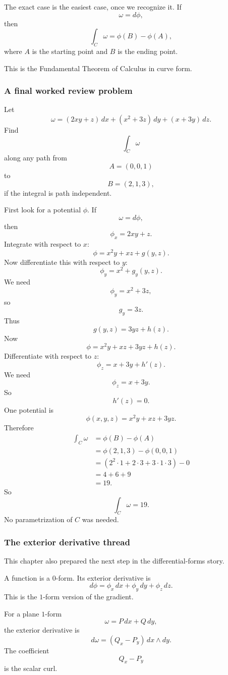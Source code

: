 The exact case is the easiest case, once we recognize it.  If
\[
    \omega=d\phi,
\]
then
\[
\boxed{
    \int_C \omega=\phi(B)-\phi(A),
}
\]
where \(A\) is the starting point and \(B\) is the ending point.

This is the Fundamental Theorem of Calculus in curve form.

\subsubsection*{A final worked review problem}

Let
\[
    \omega=(2xy+z)\,dx+(x^2+3z)\,dy+(x+3y)\,dz.
\]
Find
\[
    \int_C \omega
\]
along any path from
\[
    A=(0,0,1)
\]
to
\[
    B=(2,1,3),
\]
if the integral is path independent.

First look for a potential \(\phi\).  If
\[
    \omega=d\phi,
\]
then
\[
    \phi_x=2xy+z.
\]
Integrate with respect to \(x\):
\[
    \phi=x^2y+xz+g(y,z).
\]
Now differentiate this with respect to \(y\):
\[
    \phi_y=x^2+g_y(y,z).
\]
We need
\[
    \phi_y=x^2+3z,
\]
so
\[
    g_y=3z.
\]
Thus
\[
    g(y,z)=3yz+h(z).
\]
Now
\[
    \phi=x^2y+xz+3yz+h(z).
\]
Differentiate with respect to \(z\):
\[
    \phi_z=x+3y+h'(z).
\]
We need
\[
    \phi_z=x+3y.
\]
So
\[
    h'(z)=0.
\]
One potential is
\[
\boxed{
    \phi(x,y,z)=x^2y+xz+3yz.
}
\]
Therefore
\[
\begin{aligned}
\int_C \omega
&=
\phi(B)-\phi(A)\\
&=
\phi(2,1,3)-\phi(0,0,1)\\
&=
(2^2\cdot1+2\cdot3+3\cdot1\cdot3)-0\\
&=
4+6+9\\
&=
19.
\end{aligned}
\]
So
\[
\boxed{
    \int_C \omega=19.
}
\]
No parametrization of \(C\) was needed.

\subsubsection*{The exterior derivative thread}

This chapter also prepared the next step in the differential-forms story.

A function is a \(0\)-form.  Its exterior derivative is
\[
    d\phi=\phi_x\,dx+\phi_y\,dy+\phi_z\,dz.
\]
This is the \(1\)-form version of the gradient.

For a plane \(1\)-form
\[
    \omega=P\,dx+Q\,dy,
\]
the exterior derivative is
\[
\boxed{
    d\omega=(Q_x-P_y)\,dx\wedge dy.
}
\]
The coefficient
\[
    Q_x-P_y
\]
is the scalar curl.

